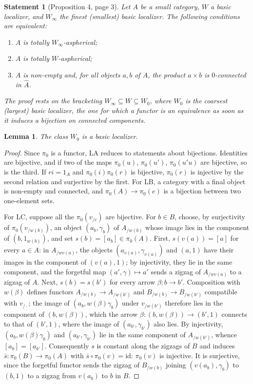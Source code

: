\documentclass[11pt]{article}
\theoremstyle{plain}
\newtheorem*{enonce}{Statement}
\newtheorem{lemme}{Lemma}[section]
\theoremstyle{definition}
\theoremstyle{remark}
\begin{document}
\begin{enonce}[Proposition 4, page 3]
Let $A$ be a small category, $W$ a basic localizer, and $W_\infty$ the finest (smallest) basic localizer. The following conditions are equivalent:
\begin{enumerate}
\item[(i)] $A$ is totally $W_\infty$-aspherical;
\item[(ii)] $A$ is totally $W$-aspherical;
\item[(iii)] $A$ is non-empty and, for all objects $a, b$ of $A$, the product $a \times b$ is $0$-connected in $\hat A$.
\end{enumerate}
The proof rests on the bracketing $W_\infty \subseteq W \subseteq W_0$, where $W_0$ is the coarsest (largest) basic localizer, the one for which a functor is an equivalence as soon as it induces a bijection on connected components.
\end{enonce}

\begin{lemme}\label{lem:114-W0}
The class $W_0$ is a basic localizer.
\end{lemme}

\begin{proof}
Since $\pi_0$ is a functor, LA reduces to statements about bijections. Identities are bijective, and if two of the maps $\pi_0(u)$, $\pi_0(u')$, $\pi_0(u'u)$ are bijective, so is the third. If $ri = 1_A$ and $\pi_0(i)\pi_0(r)$ is bijective, $\pi_0(r)$ is injective by the second relation and surjective by the first. For LB, a category with a final object is non-empty and connected, and $\pi_0(A) \to \pi_0(e)$ is a bijection between two one-element sets.

For LC, suppose all the $\pi_0(v_{/c})$ are bijective. For $b \in B$, choose, by surjectivity of $\pi_0(v_{/w(b)})$, an object $(a_b, \gamma_b)$ of $A_{/w(b)}$ whose image lies in the component of $(b, 1_{w(b)})$, and set $s(b) = [a_b] \in \pi_0(A)$. First, $s(v(a)) = [a]$ for every $a \in A$: in $A_{/wv(a)}$, the objects $(a_{v(a)}, \gamma_{v(a)})$ and $(a, 1)$ have their images in the component of $(v(a), 1)$; by injectivity, they lie in the same component, and the forgetful map $(a', \gamma) \mapsto a'$ sends a zigzag of $A_{/wv(a)}$ to a zigzag of $A$. Next, $s(b) = s(b')$ for every arrow $\beta : b \to b'$. Composition with $w(\beta)$ defines functors $A_{/w(b)} \to A_{/w(b')}$ and $B_{/w(b)} \to B_{/w(b')}$ compatible with $v_{/\cdot}$; the image of $(a_b, w(\beta)\gamma_b)$ under $v_{/w(b')}$ therefore lies in the component of $(b, w(\beta))$, which the arrow $\beta : (b, w(\beta)) \to (b', 1)$ connects to that of $(b', 1)$, where the image of $(a_{b'}, \gamma_{b'})$ also lies. By injectivity, $(a_b, w(\beta)\gamma_b)$ and $(a_{b'}, \gamma_{b'})$ lie in the same component of $A_{/w(b')}$, whence $[a_b] = [a_{b'}]$. Consequently $s$ is constant along the zigzags of $B$ and induces $\bar s : \pi_0(B) \to \pi_0(A)$ with $\bar s \circ \pi_0(v) = \mathrm{id}$: $\pi_0(v)$ is injective. It is surjective, since the forgetful functor sends the zigzag of $B_{/w(b)}$ joining $(v(a_b), \gamma_b)$ to $(b, 1)$ to a zigzag from $v(a_b)$ to $b$ in $B$.
\end{proof}
\end{document}
